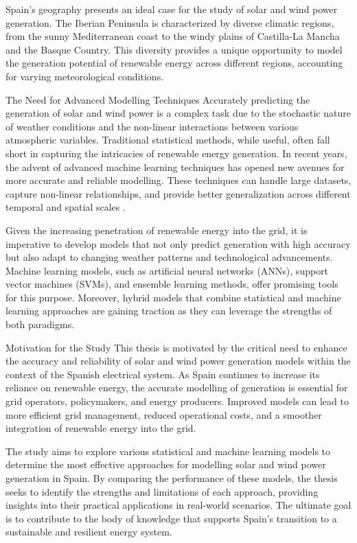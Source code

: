 Spain's geography presents an ideal case for the study of solar and wind power generation. The Iberian Peninsula is characterized by diverse climatic regions, from the sunny Mediterranean coast to the windy plains of Castilla-La Mancha and the Basque Country. This diversity provides a unique opportunity to model the generation potential of renewable energy across different regions, accounting for varying meteorological conditions.

The Need for Advanced Modelling Techniques
Accurately predicting the generation of solar and wind power is a complex task due to the stochastic nature of weather conditions and the non-linear interactions between various atmospheric variables. Traditional statistical methods, while useful, often fall short in capturing the intricacies of renewable energy generation. In recent years, the advent of advanced machine learning techniques has opened new avenues for more accurate and reliable modelling. These techniques can handle large datasets, capture non-linear relationships, and provide better generalization across different temporal and spatial scales .

Given the increasing penetration of renewable energy into the grid, it is imperative to develop models that not only predict generation with high accuracy but also adapt to changing weather patterns and technological advancements. Machine learning models, such as artificial neural networks (ANNs), support vector machines (SVMs), and ensemble learning methods, offer promising tools for this purpose. Moreover, hybrid models that combine statistical and machine learning approaches are gaining traction as they can leverage the strengths of both paradigms.

Motivation for the Study
This thesis is motivated by the critical need to enhance the accuracy and reliability of solar and wind power generation models within the context of the Spanish electrical system. As Spain continues to increase its reliance on renewable energy, the accurate modelling of generation is essential for grid operators, policymakers, and energy producers. Improved models can lead to more efficient grid management, reduced operational costs, and a smoother integration of renewable energy into the grid.

The study aims to explore various statistical and machine learning models to determine the most effective approaches for modelling solar and wind power generation in Spain. By comparing the performance of these models, the thesis seeks to identify the strengths and limitations of each approach, providing insights into their practical applications in real-world scenarios. The ultimate goal is to contribute to the body of knowledge that supports Spain's transition to a sustainable and resilient energy system.

